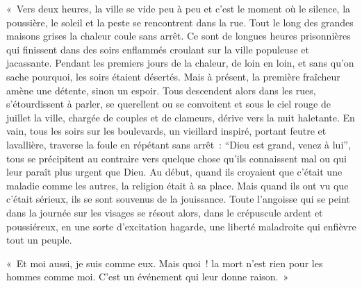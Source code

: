 \documentclass[french,twoside]{book} %
\begin{document}
« Vers deux heures, la ville se vide peu à peu et c’est le moment où le silence, la poussière, le soleil et la peste se rencontrent dans la rue. Tout le long des grandes maisons grises la chaleur coule sans arrêt. Ce sont de longues heures prisonnières qui finissent dans des soirs enflammés croulant sur la ville populeuse et jacassante. Pendant les premiers jours de la chaleur, de loin en loin, et sans qu’on sache pourquoi, les soirs étaient désertés. Mais à présent, la première fraîcheur amène une détente, sinon un espoir. Tous descendent alors dans les rues, s’étourdissent à parler, se querellent ou se convoitent et sous le ciel rouge de juillet la ville, chargée de couples et de clameurs, dérive vers la nuit haletante. En vain, tous les soirs sur les boulevards, un vieillard inspiré, portant feutre et lavallière, traverse la foule en répétant sans arrêt : “Dieu est grand, venez à lui”, tous se précipitent au contraire vers quelque chose qu’ils connaissent mal ou qui leur paraît plus urgent que Dieu. Au début, quand ils croyaient que c’était une maladie comme les autres, la religion était à sa place. Mais quand ils ont vu que c’était sérieux, ils se sont souvenus de la jouissance. Toute l’angoisse qui se peint dans la journée sur les visages se résout alors, dans le crépuscule ardent et poussiéreux, en une sorte d’excitation hagarde, une liberté maladroite qui enfièvre tout un peuple.\par
« Et moi aussi, je suis comme eux. Mais quoi ! la mort n’est rien pour les hommes comme moi. C’est un événement qui leur donne raison. »
\end{document}
